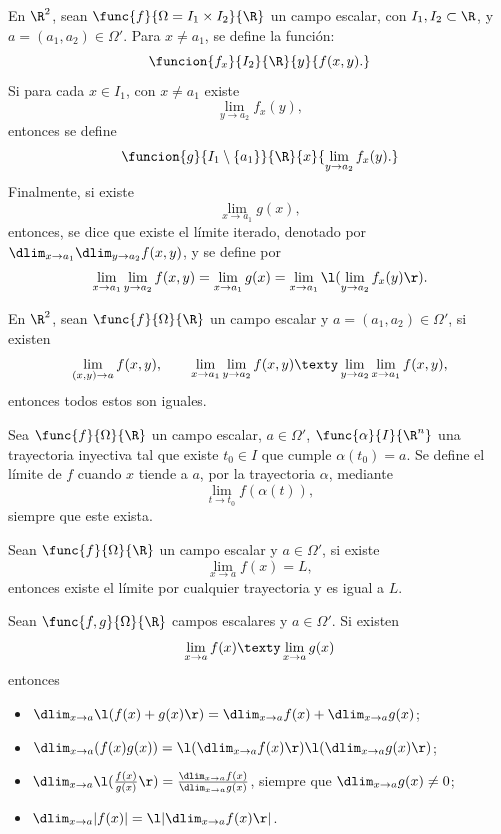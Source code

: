 \documentclass[a4,11pt]{aleph-notas}
\begin{document}
\begin{defi}
    En $\R^2$, sean $\func{f}{\Omega=I_1\times I_2}{\R}$ un campo escalar, con $I_1,I_2\subset \R$, y $a=(a_1,a_2)\in \Omega'$. Para $x\neq a_1$,  se define la función:
    \[
        \funcion{f_x}{I_2}{\R}{y}{f(x,y).}
    \]
    Si para cada $x\in I_1$, con $x\neq a_1$ existe
    \[
        \lim_{y\to a_2}f_x(y),
    \]
    entonces se define
    \[
        \funcion{g}{I_1\setminus\{a_1\}}{\R}{x}{\lim_{y\to a_2}f_x(y).}
    \]
    Finalmente, si existe
    \[
        \lim_{x\to a_1} g(x),
    \]
    entonces, se dice que existe el límite iterado, denotado por $\dlim_{x\to a_1}\dlim_{y\to a_2}f(x,y)$, y se define por
    \[
        \lim_{x\to a_1}\lim_{y\to a_2}f(x,y)=
        \lim_{x\to a_1} g(x)=
        \lim_{x\to a_1} \l(\lim_{y\to a_2}f_x(y)\r).
    \]
\end{defi}

\begin{prop}
    En $\R^2$, sean $\func{f}{\Omega}{\R}$ un campo escalar y $a=(a_1,a_2)\in \Omega'$, si existen
    \[
        \lim_{(x,y)\to a}f(x,y),
        \qquad
        \lim_{x\to a_1}\lim_{y\to a_2}f(x,y)
        \texty
        \lim_{y\to a_2}\lim_{x\to a_1}f(x,y),
    \]
    entonces todos estos son iguales.
\end{prop}

\begin{defi}
    Sea $\func{f}{\Omega}{\R}$ un campo escalar, $a\in \Omega'$, $\func{\alpha}{I}{\R^n}$ una trayectoria inyectiva tal que existe $t_0\in I$ que cumple $\alpha(t_0)=a$. Se define el límite de $f$ cuando $x$ tiende a $a$, por la trayectoria $\alpha$, mediante
    \[
        \lim_{t\to t_0} f(\alpha(t)),
    \]
    siempre que este exista.
\end{defi}


\begin{prop}
    Sean $\func{f}{\Omega}{\R}$ un campo escalar y $a\in \Omega'$, si existe
    \[
        \lim_{x\to a}f(x)=L,
    \]
    entonces existe el límite por cualquier trayectoria y es igual a $L$.
\end{prop}

\begin{prop}
    Sean $\func{f,g}{\Omega}{\R}$ campos escalares y $a\in \Omega'$. Si existen
    \[
        \lim_{x\to a}f(x)
        \texty
        \lim_{x\to a}g(x)
    \]
    entonces
    \begin{itemize}
    \item
        $\dlim_{x\to a}\l(f(x)+g(x)\r)=\dlim_{x\to a}f(x)+\dlim_{x\to a}g(x)$;
    \item 
        $\dlim_{x\to a}(f(x)g(x))=\l(\dlim_{x\to a}f(x)\r)\l(\dlim_{x\to a}g(x)\r)$;
    \item 
        $\dlim_{x\to a}\l(\frac{f(x)}{g(x)}\r)=\frac{\dlim_{x\to a}f(x)}{\dlim_{x\to a}g(x)}$, siempre que $\dlim_{x\to a}g(x)\neq 0$;
    \item 
        $\dlim_{x\to a}|f(x)|=\l|\dlim_{x\to a}f(x)\r|$.
    \end{itemize}
\end{prop}
\end{document}
